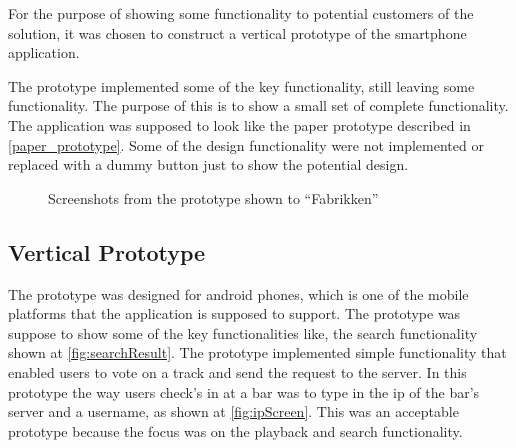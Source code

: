 For the purpose of showing some functionality to potential customers of the solution, it was chosen to construct a vertical prototype of the smartphone application.

The prototype implemented some of the key functionality, still leaving some functionality. The purpose of this is to show a small set of complete functionality. The application was supposed to look like the paper prototype described in \cref{paper_prototype}. Some of the design functionality were not implemented or replaced with a dummy button just to show the potential design.

\begin{figure}[hbtp]
  \centering
  \caption{Screenshots from the prototype shown to \enquote{Fabrikken}}
\end{figure}

\subsection{Vertical Prototype}
\label{sub:vertical_prototype}

The prototype was designed for android phones, which is one of the mobile platforms that the application is supposed to support. The prototype was suppose to show some of the key functionalities like, the search functionality shown at \cref{fig:searchResult}. The prototype implemented simple functionality that enabled users to vote on a track and send the request to the server. In this prototype the way users check's in at a bar was to type in the ip of the bar's server and a username, as shown at \cref{fig:ipScreen}. This was an acceptable prototype because the focus was on the playback and search functionality.